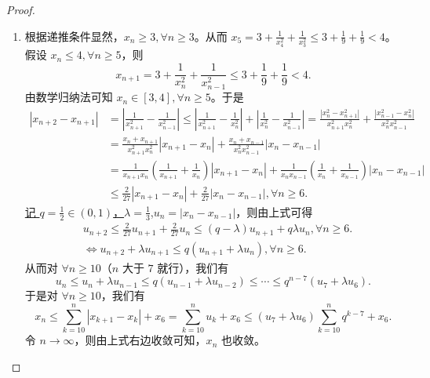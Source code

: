 \documentclass[../../main.tex]{subfiles}
\begin{document}
\begin{proof}
\begin{enumerate}
\item 根据递推条件显然，\(x_n\geqslant 3,\forall n\geqslant 3\)。从而 \(x_5 = 3+\frac{1}{x_{4}^{2}}+\frac{1}{x_{3}^{2}}\leqslant 3+\frac{1}{9}+\frac{1}{9}<4\)。假设 \(x_n\leqslant 4,\forall n\geqslant 5\)，则
\[
x_{n + 1}=3+\frac{1}{x_{n}^{2}}+\frac{1}{x_{n - 1}^{2}}\leqslant 3+\frac{1}{9}+\frac{1}{9}<4.
\]
由数学归纳法可知 \(x_n\in [3,4],\forall n\geqslant 5\)。于是
\begin{align*}
\left| x_{n+2}-x_{n+1} \right|&=\left| \frac{1}{x_{n+1}^{2}}-\frac{1}{x_{n-1}^{2}} \right|\leqslant \left| \frac{1}{x_{n+1}^{2}}-\frac{1}{x_{n}^{2}} \right|+\left| \frac{1}{x_{n}^{2}}-\frac{1}{x_{n-1}^{2}} \right|=\frac{\left| x_{n}^{2}-x_{n+1}^{2} \right|}{x_{n+1}^{2}x_{n}^{2}}+\frac{\left| x_{n-1}^{2}-x_{n}^{2} \right|}{x_{n}^{2}x_{n-1}^{2}}
\\
&=\frac{x_n+x_{n+1}}{x_{n+1}^{2}x_{n}^{2}}\left| x_{n+1}-x_n \right|+\frac{x_n+x_{n-1}}{x_{n}^{2}x_{n-1}^{2}}\left| x_n-x_{n-1} \right|
\\
&=\frac{1}{x_{n+1}x_n}\left( \frac{1}{x_{n+1}}+\frac{1}{x_n} \right) \left| x_{n+1}-x_n \right|+\frac{1}{x_nx_{n-1}}\left( \frac{1}{x_n}+\frac{1}{x_{n-1}} \right) \left| x_n-x_{n-1} \right|
\\
&\leqslant \frac{2}{27}\left| x_{n+1}-x_n \right|+\frac{2}{27}\left| x_n-x_{n-1} \right|,\forall n\geqslant 6.      
\end{align*}
\hyperlink{取q,lambda的原因}{记 \(q = \frac{1}{2}\in(0,1)\)，\(\lambda=\frac{1}{3}\)},\(u_n = |x_n - x_{n - 1}|\)，则由上式可得
\begin{align*}
&u_{n + 2}\leqslant \frac{2}{27}u_{n + 1}+\frac{2}{27}u_n
\leqslant (q - \lambda)u_{n + 1}+q\lambda u_n,\forall n\geqslant 6.\\
&\Leftrightarrow u_{n + 2}+\lambda u_{n + 1}\leqslant q(u_{n + 1}+\lambda u_n),\forall n\geqslant 6.
\end{align*}
从而对 \(\forall n\geqslant 10\)（\(n\) 大于 \(7\) 就行），我们有
\[
u_n\leqslant u_n+\lambda u_{n - 1}\leqslant q(u_{n - 1}+\lambda u_{n - 2})\leqslant\cdots\leqslant q^{n - 7}(u_7+\lambda u_6).
\]
于是对 \(\forall n\geqslant 10\)，我们有
\[
x_n\leqslant \sum_{k = 10}^n|x_{k + 1}-x_k|+x_6=\sum_{k = 10}^n u_k+x_6\leqslant (u_7+\lambda u_6)\sum_{k = 10}^n q^{k - 7}+x_6.
\]
令 \(n\rightarrow\infty\)，则由上式右边收敛可知，\(x_n\) 也收敛。
\end{enumerate}    
\end{proof}
\end{document}
